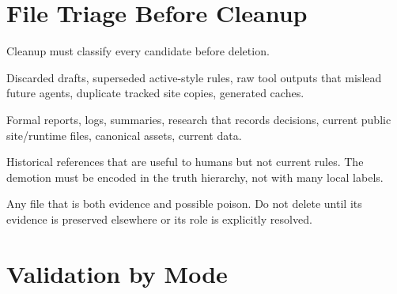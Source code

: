 \documentclass[a4paper,11pt,openany]{report}
\begin{document}
\section{File Triage Before Cleanup}

Cleanup must classify every candidate before deletion.

\begin{description}[style=nextline]
  \item[Delete]
    Discarded drafts, superseded active-style rules, raw tool outputs that
    mislead future agents, duplicate tracked site copies, generated caches.

  \item[Keep]
    Formal reports, logs, summaries, research that records decisions, current
    public site/runtime files, canonical assets, current data.

  \item[Demote]
    Historical references that are useful to humans but not current rules. The
    demotion must be encoded in the truth hierarchy, not with many local labels.

  \item[Review]
    Any file that is both evidence and possible poison. Do not delete until its
    evidence is preserved elsewhere or its role is explicitly resolved.
\end{description}

\section{Validation by Mode}
\end{document}
